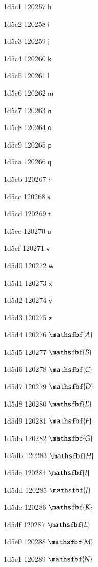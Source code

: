 \documentclass[11pt]{article}
\begin{document}
1d5c1 120257 \ensuremath{\mathsf{h}}

1d5c2 120258 \ensuremath{\mathsf{i}}

1d5c3 120259 \ensuremath{\mathsf{j}}

1d5c4 120260 \ensuremath{\mathsf{k}}

1d5c5 120261 \ensuremath{\mathsf{l}}

1d5c6 120262 \ensuremath{\mathsf{m}}

1d5c7 120263 \ensuremath{\mathsf{n}}

1d5c8 120264 \ensuremath{\mathsf{o}}

1d5c9 120265 \ensuremath{\mathsf{p}}

1d5ca 120266 \ensuremath{\mathsf{q}}

1d5cb 120267 \ensuremath{\mathsf{r}}

1d5cc 120268 \ensuremath{\mathsf{s}}

1d5cd 120269 \ensuremath{\mathsf{t}}

1d5ce 120270 \ensuremath{\mathsf{u}}

1d5cf 120271 \ensuremath{\mathsf{v}}

1d5d0 120272 \ensuremath{\mathsf{w}}

1d5d1 120273 \ensuremath{\mathsf{x}}

1d5d2 120274 \ensuremath{\mathsf{y}}

1d5d3 120275 \ensuremath{\mathsf{z}}

1d5d4 120276 \ensuremath{\mathsfbf{A}}

1d5d5 120277 \ensuremath{\mathsfbf{B}}

1d5d6 120278 \ensuremath{\mathsfbf{C}}

1d5d7 120279 \ensuremath{\mathsfbf{D}}

1d5d8 120280 \ensuremath{\mathsfbf{E}}

1d5d9 120281 \ensuremath{\mathsfbf{F}}

1d5da 120282 \ensuremath{\mathsfbf{G}}

1d5db 120283 \ensuremath{\mathsfbf{H}}

1d5dc 120284 \ensuremath{\mathsfbf{I}}

1d5dd 120285 \ensuremath{\mathsfbf{J}}

1d5de 120286 \ensuremath{\mathsfbf{K}}

1d5df 120287 \ensuremath{\mathsfbf{L}}

1d5e0 120288 \ensuremath{\mathsfbf{M}}

1d5e1 120289 \ensuremath{\mathsfbf{N}}
\end{document}

